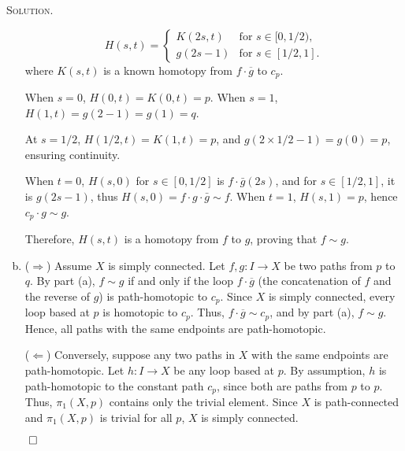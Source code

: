 \documentclass[12pt, a4paper, oneside]{ctexart}
\newenvironment{solution}{%
	\par\noindent\textsc{Solution. }\ignorespaces
}{%
	\hfill$\qed$\par
}
\begin{document}
\begin{solution}
\begin{enumerate}[(a)]
                                \[
                                H(s,t) =
                                \begin{cases}
                                K(2s,t) & \text{for } s \in [0,1/2), \\
                                g(2s - 1) & \text{for } s \in [1/2, 1].
                                \end{cases}
                                \]
                                where \( K(s,t) \) is a known homotopy from \( f \cdot \overline{g} \) to \( c_p \).

                                When \( s = 0 \), \( H(0,t) = K(0,t) = p \).
                                When \( s = 1 \), \( H(1,t) = g(2-1) = g(1) = q \).

                                At \( s = 1/2 \), \( H(1/2,t) = K(1,t) = p \), and \( g(2 \times 1/2 - 1) = g(0) = p \), ensuring continuity.

                                When \( t = 0 \), \( H(s,0) \) for \( s \in [0,1/2] \) is \( f\cdot \bar{g}(2s) \), 
                                and for \( s \in [1/2,1] \), it is \( g(2s - 1) \), thus 
                                \( H(s,0) = f \cdot g \cdot \bar{g}\sim f \).
                                When \( t = 1 \), \( H(s,1) = p \), hence \( c_p \cdot g \sim g \).

                                Therefore, \( H(s,t) \) is a homotopy from \( f \) to \( g \), 
                                proving that \( f \sim g \).

                        \item ($\Rightarrow$) 
                                Assume \( X \) is simply connected. Let \( f, g: I \to X \) be two paths from 
                                \( p \) to \( q \). By part (a), \( f \sim g \) if and only if the loop 
                                \( f \cdot \overline{g} \) (the concatenation of \( f \) and the reverse of 
                                \( g \)) is path-homotopic to \( c_p \). Since \( X \) is simply connected, 
                                every loop based at \( p \) is homotopic to \( c_p \). 
                                Thus, \( f \cdot \overline{g} \sim c_p \), and by part (a), \( f \sim g \). 
                                Hence, all paths with the same endpoints are path-homotopic.

                                ($\Leftarrow$) 
                                Conversely, suppose any two paths in \( X \) with the same endpoints are path-homotopic. 
                                Let \( h: I \to X \) be any loop based at \( p \). By assumption, \( h \) is 
                                path-homotopic to the constant path \( c_p \), since both are paths 
                                from \( p \) to \( p \). Thus, \(\pi_1(X, p)\) contains only the trivial element. 
                                Since \( X \) is path-connected and \(\pi_1(X, p)\) is trivial for all \( p \), 
                                \( X \) is simply connected.


\end{enumerate}
\end{solution}
\end{document}
